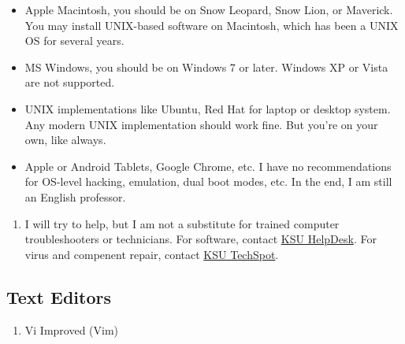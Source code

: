 \documentclass[]{article}
\begin{document}
\begin{itemize}
\itemsep1pt\parskip0pt
\item
  Apple Macintosh, you should be on Snow Leopard, Snow Lion, or
  Maverick. You may install UNIX-based software on Macintosh, which has
  been a UNIX OS for several years.
\item
  MS Windows, you should be on Windows 7 or later. Windows XP or Vista
  are not supported.
\item
  UNIX implementations like Ubuntu, Red Hat for laptop or desktop
  system. Any modern UNIX implementation should work fine. But you're on
  your own, like always.
\item
  Apple or Android Tablets, Google Chrome, etc. I have no
  recommendations for OS-level hacking, emulation, dual boot modes, etc.
  In the end, I am still an English professor.\\
\end{itemize}

\begin{enumerate}
\def\labelenumi{\arabic{enumi}.}
\setcounter{enumi}{4}
\itemsep1pt\parskip0pt
\item
  I will try to help, but I am not a substitute for trained computer
  troubleshooters or technicians. For software, contact
  \href{http://support.kent.edu}{KSU HelpDesk}. For virus and compenent
  repair, contact
  \href{http://www2.kent.edu/is/support/thetechspot/index.cfm}{KSU
  TechSpot}.
\end{enumerate}

\subsection{Text Editors}\label{text-editors}

\begin{enumerate}
\def\labelenumi{\arabic{enumi}.}
\itemsep1pt\parskip0pt
\item
  Vi Improved (Vim)
\end{enumerate}
\end{document}
